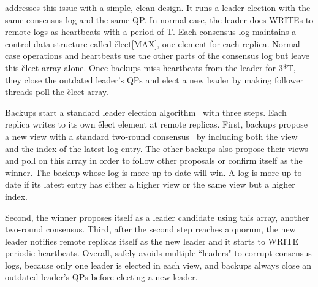 
\xxx addresses this issue with a simple, clean design. It runs a leader 
election with the same consensus log and the same QP. In normal case, the 
leader does WRITEs to remote logs as heartbeats with a period of T. Each 
consensus log maintains a control data structure called \v{elect[MAX]}, one 
element for each replica. Normal case operations and heartbeats use the other 
parts of the consensus log but leave this \v{elect} array alone. Once backups 
miss heartbeats from the leader for 3*T, they close the outdated leader's QPs 
and elect a new leader by making follower threads poll the \v{elect} array.


Backups start a standard \paxos leader election 
algorithm~\cite{paxos:practical} with three steps. Each replica writes to its 
own \v{elect} element at remote replicas. First, backups propose a new view 
with a standard two-round \paxos consensus~\cite{paxos:simple} by including 
both the view and the index of the latest log entry. The other backups also 
propose their views and poll on this array in order to follow other proposals 
or confirm itself as the winner. The backup whose log is more up-to-date will 
win. A log is more up-to-date if its latest entry has either a higher view or 
the same view but a higher index.

Second, the winner proposes itself as a leader candidate using this 
array, another two-round \paxos consensus. Third, after the second step reaches 
a quorum, the new leader notifies remote replicas itself as the new leader and 
it starts to WRITE periodic heartbeats. Overall, \xxx safely avoids multiple 
``leaders" to corrupt consensus logs, because only one leader is elected in 
each view, and backups always close an outdated leader's QPs before electing a 
new leader.


